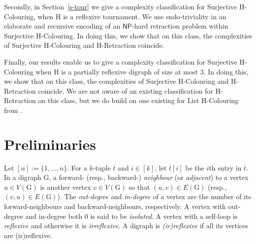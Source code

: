 \documentclass[a4paper,12pt]{article}
\theoremstyle{remark}
\newcommand{\NP}[0]{\ensuremath{\mathsf{NP}}}
\newcommand{\G}{\ensuremath{\mathrm{G}}}
\renewcommand{\H}{\ensuremath{\mathrm{H}}}
\begin{document}
Secondly, in Section~\ref{s-tour} we give a complexity classification for {\sc Surjective $\H$-Colouring}, when $\H$ is a reflexive tournament.
We use endo-triviality in an elaborate and recursive encoding of an \NP-hard retraction problem within {\sc Surjective $\H$-Colouring}.  In doing this, we show that on this class, the complexities of {\sc Surjective $\H$-Colouring} and {\sc \H-Retraction} coincide.

Finally, 
our results enable us 
to give a complexity classification for {\sc Surjective $\H$-Colouring} when $\H$ is a partially reflexive digraph of size at most $3$.  In doing this, we show that on this class, the complexities of {\sc Surjective $\H$-Colouring} and {\sc \H-Retraction} coincide. We are not aware of an existing classification for {\sc \H-Retraction} on this class, but we do build on one existing for {\sc List \H-Colouring} from \cite{FederHellTucker}. %

\section{Preliminaries}\label{s-pre}

Let $[n]:=\{1,\ldots,n\}$. For a $k$-tuple $\overline{t}$ and $i \in [k]$, let $\overline{t}[i]$ be the $i$th entry in $\overline{t}$. In a digraph $\G$, a forward- (resp., backward-) \emph{neighbour} (or \emph{adjacent}) to a vertex $u \in V(\G)$ is another vertex $v \in V(\G)$ so that $(u,v) \in E(\G)$ (resp., $(v,u) \in E(\G)$). The \emph{out-degree} and \emph{in-degree} of a vertex are the number of its forward-neighbours and backward-neighbours, respectively. 
A vertex with out-degree and in-degree both 0 is said to be \emph{isolated}. A vertex with a self-loop is \emph{reflexive} and otherwise it is \emph{irreflexive}. A digraph is \emph{(ir)reflexive} if all its vertices are (ir)reflexive.
\end{document}
